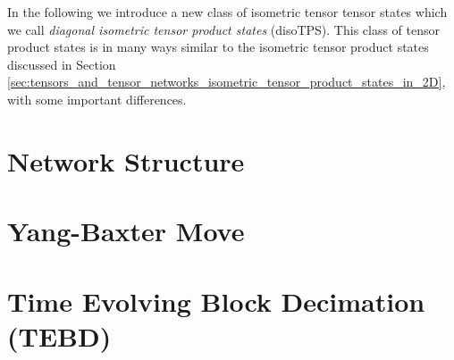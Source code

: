 In the following we introduce a new class of isometric tensor tensor states which we call \textit{diagonal isometric tensor product states} (disoTPS). This class of tensor product states is in many ways similar to the isometric tensor product states discussed in Section \ref{sec:tensors_and_tensor_networks_isometric_tensor_product_states_in_2D}, with some important differences. 

\section{Network Structure}
\label{sec:disoTPS_network_structure}


\section{Yang-Baxter Move}
\label{sec:disoTPS_yang_baxter_move}


\section{Time Evolving Block Decimation (TEBD)}
\label{sec:disoTPS_TEBD}
